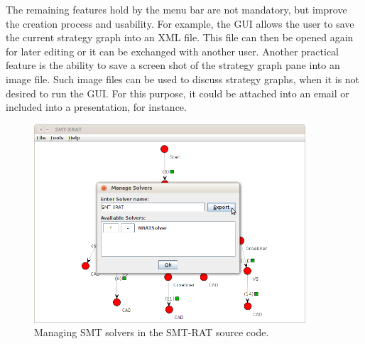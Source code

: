 The remaining features hold by the menu bar are not mandatory, but improve the creation 
process and usability. For example, the GUI allows the user to save the current strategy
graph into an XML file. This file can then be opened again for later editing or it can be
exchanged with another user. Another practical feature is the ability to save a screen shot
of the strategy graph pane into an image file. Such image files can be used to discuss
strategy graphs, when it is not desired to run the GUI. For this purpose, it could be
attached into an email or included into a presentation, for instance.
\begin{figure}
  \begin{center}
    \includegraphics[width=0.9\textwidth]{graphics/smt-xrat_manage_solvers.png}
  \end{center}
  \caption{Managing SMT solvers in the SMT-RAT source code.}
  \label{fig:managing_smt_solvers}
\end{figure}


